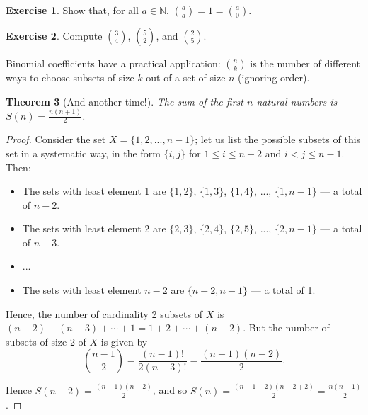 \documentclass[a4paper]{amsart}
\newtheorem{thm}{Theorem}[section]
\theoremstyle{definition}
\newtheorem{exercise}[thm]{Exercise}
\theoremstyle{remark}
\begin{document}
\begin{exercise}
  Show that, for all $ a \in \mathbb{N} $, $ \binom{a}{a} = 1 = \binom{a}{0} $.
\end{exercise}

\begin{exercise}
  Compute $ \binom{3}{4} $, $ \binom{5}{2} $, and $ \binom{2}{5} $.
\end{exercise}

Binomial coefficients have a practical application: $ \binom{n}{k} $ is the number of different ways to choose subsets of size $ k $
out of a set of size $ n $ (ignoring order).

\begin{thm}[And another time!]\label{ex:w2}
  The sum of the first $ n $ natural numbers is $ S(n) = \frac{n(n+1)}{2} $.
\end{thm}
\begin{proof}
  Consider the set $ X = \{1, 2, ..., n-1\} $; let us list the possible subsets of this set in a systematic way, in the form $ \{i,j\} $
  for $ 1 \leq i \leq n - 2 $ and $ i < j \leq n - 1 $. Then:
  \begin{itemize}
    \item The sets with least element 1 are $ \{1, 2\} $, $ \{1, 3\} $, $ \{1, 4\} $, ..., $ \{1, n-1\} $ --- a total of $ n - 2 $.
    \item The sets with least element 2 are $ \{2, 3\} $, $ \{2, 4\} $, $ \{2, 5\} $, ..., $ \{2, n-1\} $ --- a total of $ n - 3 $.
    \item ...
    \item The sets with least element $ n - 2 $ are $ \{n - 2, n - 1\} $ --- a total of 1.
  \end{itemize}

  Hence, the number of cardinality 2 subsets of $ X $ is $ (n - 2) + (n - 3) + \cdots + 1 = 1 + 2 + \cdots + (n - 2) $. But the number
  of subsets of size 2 of $ X $ is given by
  \begin{displaymath}
    \binom{n - 1}{2} = \frac{(n - 1)!}{2(n - 3)!} = \frac{(n-1)(n-2)}{2}.
  \end{displaymath}

  Hence $ S(n - 2) = \frac{(n-1)(n-2)}{2} $, and so $ S(n) = \frac{(n - 1 + 2)(n - 2 + 2)}{2} = \frac{n(n+1)}{2} $.
\end{proof}
\end{document}
